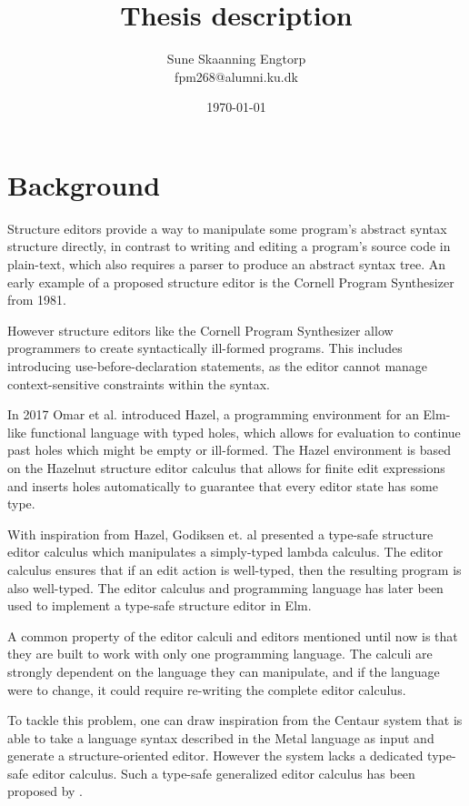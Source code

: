 \documentclass{article}
\title{Thesis description}
\author{Sune Skaanning Engtorp \\ fpm268@alumni.ku.dk}
\date{\today}
\begin{document}
\maketitle

\section{Background}

Structure editors provide a way to manipulate some program's abstract syntax structure directly, in contrast to writing and editing a program's source code in plain-text, which also requires a parser to produce an abstract syntax tree. An early example of a proposed structure editor is the Cornell Program Synthesizer\cite{cornell} from 1981.

However structure editors like the Cornell Program Synthesizer\cite{cornell} allow programmers to create syntactically ill-formed programs. This includes introducing use-before-declaration statements, as the editor cannot manage context-sensitive constraints within the syntax.

In 2017 Omar et al. introduced Hazel\cite{omar}, a programming environment for an Elm-like functional language with typed holes, which allows for evaluation to continue past holes which might be empty or ill-formed. The Hazel environment is based on the Hazelnut structure editor calculus that allows for finite edit expressions and inserts holes automatically to guarantee that every editor state has some type.

With inspiration from Hazel, Godiksen et. al \cite{godiksen} presented a type-safe structure editor calculus which manipulates a simply-typed lambda calculus. The editor calculus ensures that if an edit action is well-typed, then the resulting program is also well-typed. The editor calculus and programming language has later been used to implement a type-safe structure editor in Elm\cite{PAINT2023-missing ref}.

A common property of the editor calculi and editors mentioned until now is that they are built to work with only one programming language. The calculi are strongly dependent on the language they can manipulate, and if the language were to change, it could require re-writing the complete editor calculus.

To tackle this problem, one can draw inspiration from the Centaur system\cite{centaur} that is able to take a language syntax described in the Metal language as input and generate a structure-oriented editor. However the system lacks a dedicated type-safe editor calculus. Such a type-safe generalized editor calculus has been proposed by \cite{missing ref}.
\end{document}
